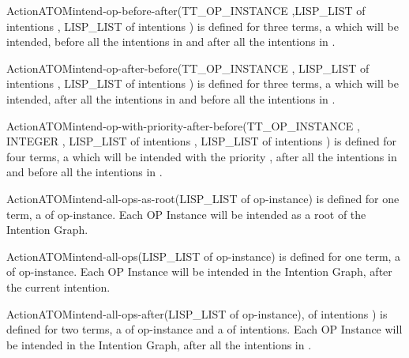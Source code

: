 \begin{typeefa}{Action}{ATOM}{intend-op-before-after}{(TT\_OP\_INSTANCE ,LISP\_LIST of intentions , LISP\_LIST of intentions )}
is defined for three terms, a   which will be
intended, before all the intentions in  and after all the
intentions in .
\end{typeefa}

\begin{typeefa}{Action}{ATOM}{intend-op-after-before}{(TT\_OP\_INSTANCE , LISP\_LIST of intentions , LISP\_LIST of intentions )}
is defined for three terms, a   which will be
intended, after all the intentions in  and before all the intentions
in .
\end{typeefa}

\begin{typeefa}{Action}{ATOM}{intend-op-with-priority-after-before}{(TT\_OP\_INSTANCE , INTEGER , LISP\_LIST of intentions , LISP\_LIST of intentions )}
is defined for four terms, a   which will be
intended with the priority , after all the intentions in
 and before all the intentions in .
\end{typeefa}

\begin{typeefa}{Action}{ATOM}{intend-all-ops-as-root}{(LISP\_LIST of op-instance)}
is defined for one term, a  of op-instance. Each OP
Instance will be intended as a root of the Intention Graph.
\end{typeefa}

\begin{typeefa}{Action}{ATOM}{intend-all-ops}{(LISP\_LIST of op-instance)}
is defined for one term, a  of op-instance. Each OP Instance will be
intended in the Intention Graph, after the current intention.
\end{typeefa}

\begin{typeefa}{Action}{ATOM}{intend-all-ops-after}{(LISP\_LIST of op-instance),
 of intentions )} is defined for two terms, a  of
op-instance and  a  of intentions. Each OP Instance will be
intended in the Intention Graph, after all the intentions in .
\end{typeefa}

